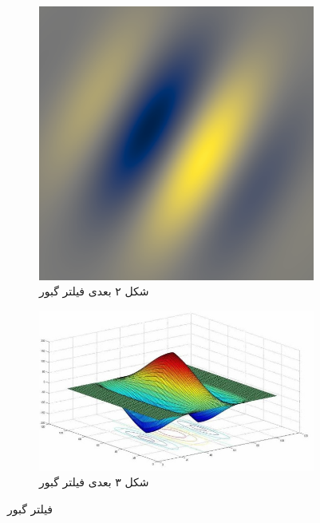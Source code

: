         \begin{figure}[!ht]
            \centering
            \begin{subfigure}[b]{0.3\textwidth}
                \includegraphics[width=\textwidth]{images/Gabor-2d.png}
                \caption{شکل ۲ بعدی فیلتر گبور}
                \label{fig:part1-Gabor-2d}
            \end{subfigure}
            \hfill %
            \begin{subfigure}[b]{0.5\textwidth}
                \includegraphics[width=\textwidth]{images/Gabor-3d.jpg}
                \caption{شکل ۳ بعدی فیلتر گبور}
                \label{fig:part1-Gabor-3d}
            \end{subfigure}
            \caption{فیلتر گبور}
            \label{fig:part1-Gabor}
        \end{figure}
